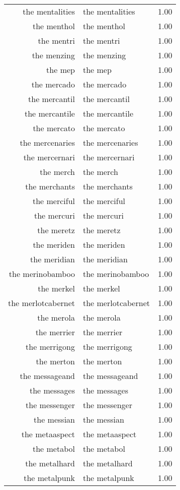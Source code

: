 \begin{table}[ht]
\begin{tabular}{rlr}
  the mentalities & the mentalities & 1.00 \\ 
  the menthol & the menthol & 1.00 \\ 
  the mentri & the mentri & 1.00 \\ 
  the menzing & the menzing & 1.00 \\ 
  the mep & the mep & 1.00 \\ 
  the mercado & the mercado & 1.00 \\ 
  the mercantil & the mercantil & 1.00 \\ 
  the mercantile & the mercantile & 1.00 \\ 
  the mercato & the mercato & 1.00 \\ 
  the mercenaries & the mercenaries & 1.00 \\ 
  the mercernari & the mercernari & 1.00 \\ 
  the merch & the merch & 1.00 \\ 
  the merchants & the merchants & 1.00 \\ 
  the merciful & the merciful & 1.00 \\ 
  the mercuri & the mercuri & 1.00 \\ 
  the meretz & the meretz & 1.00 \\ 
  the meriden & the meriden & 1.00 \\ 
  the meridian & the meridian & 1.00 \\ 
  the merinobamboo & the merinobamboo & 1.00 \\ 
  the merkel & the merkel & 1.00 \\ 
  the merlotcabernet & the merlotcabernet & 1.00 \\ 
  the merola & the merola & 1.00 \\ 
  the merrier & the merrier & 1.00 \\ 
  the merrigong & the merrigong & 1.00 \\ 
  the merton & the merton & 1.00 \\ 
  the messageand & the messageand & 1.00 \\ 
  the messages & the messages & 1.00 \\ 
  the messenger & the messenger & 1.00 \\ 
  the messian & the messian & 1.00 \\ 
  the metaaspect & the metaaspect & 1.00 \\ 
  the metabol & the metabol & 1.00 \\ 
  the metalhard & the metalhard & 1.00 \\ 
  the metalpunk & the metalpunk & 1.00 \\ 

\end{tabular}
\end{table}
